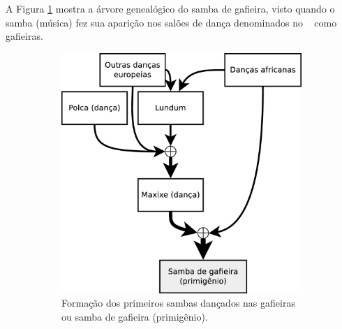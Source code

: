 A Figura \ref{fig:formuladosambagafieira} mostra a árvore genealógico do samba de gafieira,
visto quando o samba (música) fez sua aparição nos salões de dança denominados no \AnoLivro~ como gafieiras.
\begin{figure}[h]
  \centering
  \begin{subfigure}[b]{0.52\textwidth}
    \centering
    \includegraphics[width=\textwidth]{chapters/cap-historia-sambagafieira/sambagafieiraformula.eps}
    \caption{Formação dos primeiros sambas dançados nas gafieiras ou samba de gafieira (primigênio).}
    \label{fig:formuladosambagafieira}
  \end{subfigure}
  ~~
  \begin{subfigure}[b]{0.37\textwidth}
    \centering

\end{subfigure}
\end{figure}
